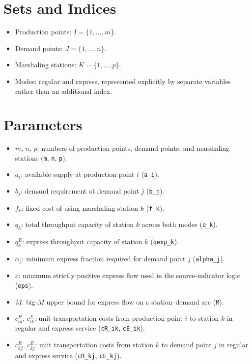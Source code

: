 \section*{Sets and Indices}

\begin{itemize}
\item Production points: $I=\{1,\dots,m\}$.
\item Demand points: $J=\{1,\dots,n\}$.
\item Marshaling stations: $K=\{1,\dots,p\}$.
\item Modes: regular and express, represented explicitly by separate variables rather than an additional index.
\end{itemize}

\section*{Parameters}

\begin{itemize}
\item $m$, $n$, $p$: numbers of production points, demand points, and marshaling stations (\texttt{m}, \texttt{n}, \texttt{p}).
\item $a_i$: available supply at production point $i$ (\texttt{a\_i}).
\item $b_j$: demand requirement at demand point $j$ (\texttt{b\_j}).
\item $f_k$: fixed cost of using marshaling station $k$ (\texttt{f\_k}).
\item $q_k$: total throughput capacity of station $k$ across both modes (\texttt{q\_k}).
\item $q^{E}_k$: express throughput capacity of station $k$ (\texttt{qexp\_k}).
\item $\alpha_j$: minimum express fraction required for demand point $j$ (\texttt{alpha\_j}).
\item $\varepsilon$: minimum strictly positive express flow used in the source-indicator logic (\texttt{eps}).
\item $M$: big-$M$ upper bound for express flow on a station--demand arc (\texttt{M}).
\item $c^{R}_{ik}$, $c^{E}_{ik}$: unit transportation costs from production point $i$ to station $k$ in regular and express service (\texttt{cR\_ik}, \texttt{cE\_ik}).
\item $c^{R}_{kj}$, $c^{E}_{kj}$: unit transportation costs from station $k$ to demand point $j$ in regular and express service (\texttt{cR\_kj}, \texttt{cE\_kj}).
\end{itemize}

